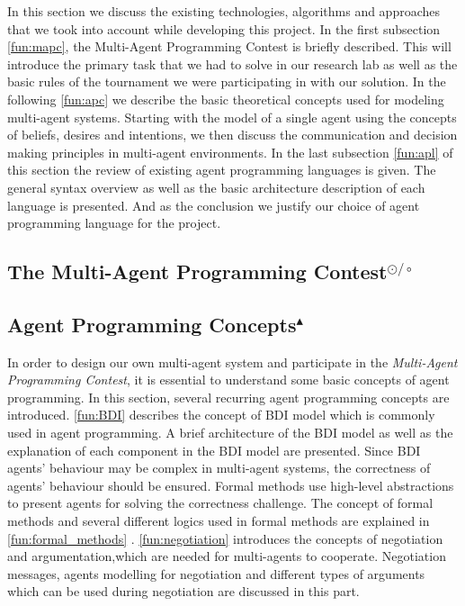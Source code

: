 In this section we discuss the existing technologies, algorithms and approaches that we took into account while developing this project.
In the first subsection \autoref{fun:mapc}, the Multi-Agent Programming Contest is briefly described.
This will introduce the primary task that we had to solve in our research lab as well as the basic rules of the tournament we were participating in with our solution.
In the following \autoref{fun:apc} we describe the basic theoretical concepts used for modeling multi-agent systems.
Starting with the model of a single agent using the concepts of beliefs, desires and intentions, we then discuss the communication and decision making principles in multi-agent environments.
In the last subsection \autoref{fun:apl} of this section the review of existing agent programming languages is given.
The general syntax overview as well as the basic architecture description of each language is presented.
And as the conclusion we justify our choice of agent programming language for the project.

\subsection[The Multi-Agent Programming Contest]{The Multi-Agent Programming Contest$^{\odot/\circ}$}\label{fun:mapc}


\subsection[Agent Programming Concepts]{Agent Programming Concepts$^{\blacktriangle}$}\label{fun:apc}
In order to design our own multi-agent system and participate in the \emph{Multi-Agent Programming Contest}, it is essential to understand some basic concepts of agent programming.
In this section, several recurring agent programming concepts are introduced.
\autoref{fun:BDI} describes the concept of BDI model which is commonly used in agent programming.
A brief architecture of the BDI model as well as the explanation of each component in the BDI model are presented.
Since BDI agents' behaviour may be complex in multi-agent systems, the correctness of agents’ behaviour should be ensured.
Formal methods use high-level abstractions to present agents for solving the correctness challenge. The concept of formal methods and several different logics used in formal methods are explained in \autoref{fun:formal_methods} .
\autoref{fun:negotiation} introduces the concepts of negotiation and argumentation,which are needed for multi-agents to cooperate.
Negotiation messages, agents modelling for negotiation and different types of arguments which can be used during negotiation are discussed in this part.

